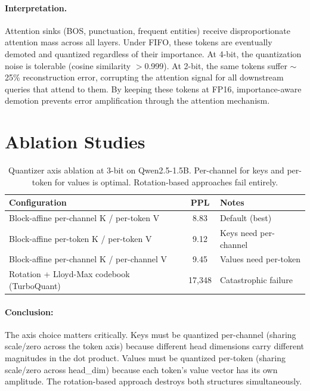 \documentclass[11pt,a4paper]{article}
\begin{document}
\paragraph{Interpretation.} Attention sinks (BOS, punctuation, frequent entities) receive disproportionate attention mass across all layers. Under FIFO, these tokens are eventually demoted and quantized regardless of their importance. At 4-bit, the quantization noise is tolerable (cosine similarity $>$0.999). At 2-bit, the same tokens suffer $\sim$25\% reconstruction error, corrupting the attention signal for all downstream queries that attend to them. By keeping these tokens at FP16, importance-aware demotion prevents error amplification through the attention mechanism.

\section{Ablation Studies}

\begin{table}[h]
\centering
\begin{tabular}{lcl}
\toprule
\textbf{Configuration} & \textbf{PPL} & \textbf{Notes} \\
\midrule
Block-affine per-channel K / per-token V & 8.83 & Default (best) \\
Block-affine per-token K / per-token V & 9.12 & Keys need per-channel \\
Block-affine per-channel K / per-channel V & 9.45 & Values need per-token \\
Rotation + Lloyd-Max codebook (TurboQuant) & 17,348 & Catastrophic failure \\
\bottomrule
\end{tabular}
\caption{Quantizer axis ablation at 3-bit on Qwen2.5-1.5B. Per-channel for keys and per-token for values is optimal. Rotation-based approaches fail entirely.}
\label{tab:ablation}
\end{table}

\paragraph{Conclusion:} The axis choice matters critically. Keys must be quantized per-channel (sharing scale/zero across the token axis) because different head dimensions carry different magnitudes in the dot product. Values must be quantized per-token (sharing scale/zero across head\_dim) because each token's value vector has its own amplitude. The rotation-based approach destroys both structures simultaneously.
\end{document}

